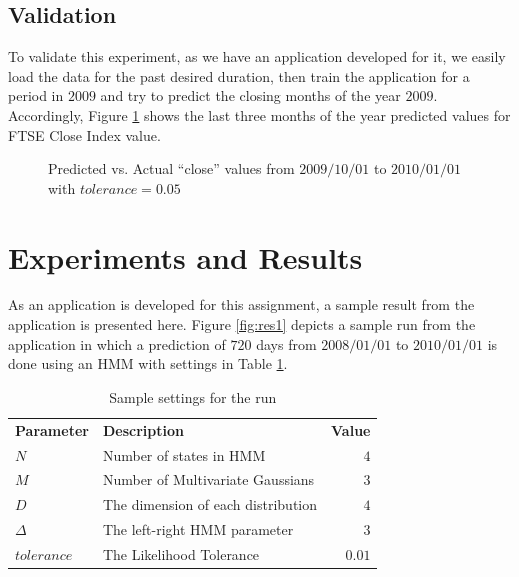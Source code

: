 \documentclass{acm_proc_article-sp}
\newcommand{\thickhline}{\noalign{\hrule height 1.0pt}}
\begin{document}
\subsection{Validation} \label{sec:valid}
To validate this experiment, as we have an application developed for it, we easily load the data for the past desired
duration, then train the application for a period in $2009$ and try to predict the closing months of the year $2009$.
Accordingly, Figure \ref{fig:validation} shows the last three months of the year predicted values for FTSE Close Index
value.

\begin{figure}[t] 
\centering
\setlength\fboxsep{0.1pt}
\setlength\fboxrule{0.7pt}
\caption{Predicted vs. Actual ``close'' values from $2009/10/01$ to $2010/01/01$ with $tolerance = 0.05$}
\label{fig:validation}
\end{figure}

\section{Experiments and Results} \label{sec:results}
As an application is developed for this assignment, a sample result from the application is presented here. Figure
\ref{fig:res1} depicts a sample run from the application in which a prediction of $720$ days from $2008/01/01$ to
$2010/01/01$ is done using an HMM with settings in Table \ref{tbl:res1}.

\begin{table}[h]
\centering
\begin{tabular}{l l r}  
\textbf{Parameter} & \textbf{Description} & \textbf{Value} \\ \thickhline
$N$ & Number of states in HMM & $4$ \\ \hline
$M$ & Number of Multivariate Gaussians & $3$ \\ \hline
$D$ & The dimension of each distribution & $4$ \\ \hline
$\Delta$ & The left-right HMM parameter & $3$ \\ \hline
$tolerance$ & The Likelihood Tolerance & $0.01$ \\ \hline
\end{tabular}
\caption{Sample settings for the run} \label{tbl:res1}
\end{table}
\end{document}
